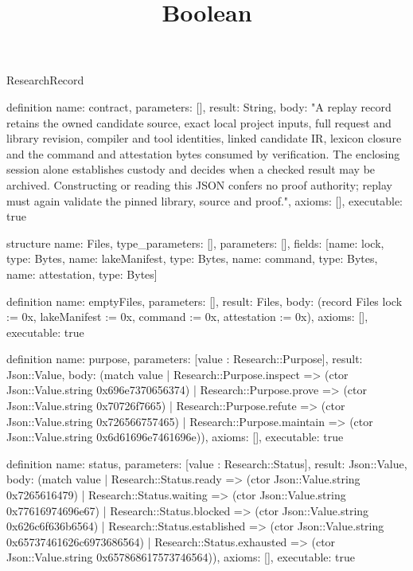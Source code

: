 \begin{lexlean}{ResearchRecord}
\title{Boolean}
\begin{semanticmodule}

definition{
 name: contract,
 parameters: [],
 result: String,
 body: "A replay record retains the owned candidate source, exact local project inputs, full request and library revision, compiler and tool identities, linked candidate IR, lexicon closure and the command and attestation bytes consumed by verification. The enclosing session alone establishes custody and decides when a checked result may be archived. Constructing or reading this JSON confers no proof authority; replay must again validate the pinned library, source and proof.",
 axioms: [],
 executable: true
}

structure{
 name: Files,
 type_parameters: [],
 parameters: [],
 fields: [{name: lock, type: Bytes}, {name: lakeManifest, type: Bytes}, {name: command, type: Bytes}, {name: attestation, type: Bytes}]
}

definition{
 name: emptyFiles,
 parameters: [],
 result: Files,
 body: (record Files {lock := 0x, lakeManifest := 0x, command := 0x, attestation := 0x}),
 axioms: [],
 executable: true
}

definition{
 name: purpose,
 parameters: [value : Research::Purpose],
 result: Json::Value,
 body: (match value | Research::Purpose.inspect => (ctor Json::Value.string 0x696e7370656374) | Research::Purpose.prove => (ctor Json::Value.string 0x70726f7665) | Research::Purpose.refute => (ctor Json::Value.string 0x726566757465) | Research::Purpose.maintain => (ctor Json::Value.string 0x6d61696e7461696e)),
 axioms: [],
 executable: true
}

definition{
 name: status,
 parameters: [value : Research::Status],
 result: Json::Value,
 body: (match value | Research::Status.ready => (ctor Json::Value.string 0x7265616479) | Research::Status.waiting => (ctor Json::Value.string 0x77616974696e67) | Research::Status.blocked => (ctor Json::Value.string 0x626c6f636b6564) | Research::Status.established => (ctor Json::Value.string 0x65737461626c6973686564) | Research::Status.exhausted => (ctor Json::Value.string 0x657868617573746564)),
 axioms: [],
 executable: true
}


\end{semanticmodule}
\end{lexlean}
